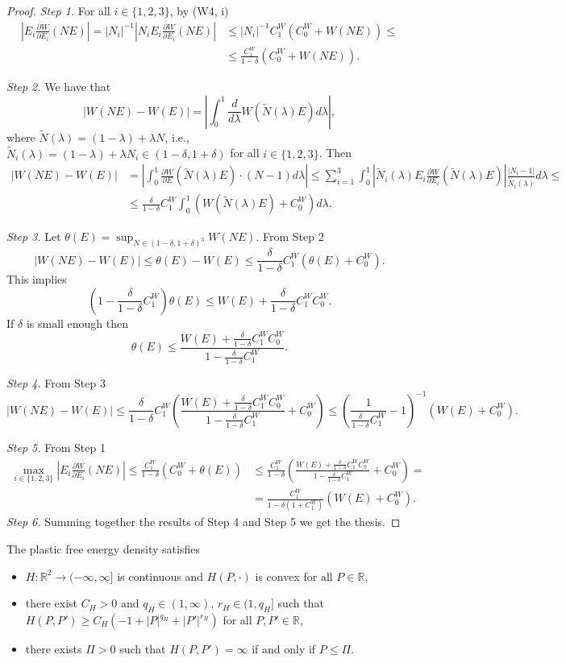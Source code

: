 \documentclass[a4paper,10pt,twoside]{amsbook}
\numberwithin{section}{chapter}
\numberwithin{equation}{chapter}
\theoremstyle{definition}
\newcommand{\dind}[2]{\frac{\partial #1}{\partial #2}}
\begin{document}
\begin{proof}
\emph{Step 1.} For all $i\in\{1,2,3\}$, by (W4, i)
\[
\begin{split}
\left|E_i\dind{W}{E_i}(NE)\right|=|N_i|^{-1}\left|N_iE_i\dind{W}{E_i}(NE)\right|&\le|N_i|^{-1}C_1^W(C_0^W+W(NE))\le\\
&\le\frac{C_1^W}{1-\delta}(C_0^W+W(NE)).
\end{split}
\]

\emph{Step 2.} We have that
\[
|W(NE)-W(E)|=\left|\int_0^1\frac{d}{d\lambda}W(\tilde N(\lambda)E)d\lambda\right|,
\]
where $\tilde N(\lambda)=(1-\lambda)+\lambda N$, i.e., $\tilde N_i(\lambda)=(1-\lambda)+\lambda N_i\in(1-\delta,1+\delta)$ for all $i\in\{1,2,3\}$. Then
\[
\begin{split}
|W(NE)-W(E)|&=\left|\int_0^1\dind{W}{E}(\tilde N(\lambda)E)\cdot(N-1)d\lambda\right|\le\sum_{i=1}^3\int_0^1\left|\tilde N_i(\lambda)E_i\dind{W}{E_i}(\tilde N(\lambda)E)\right|\frac{|N_i-1|}{\tilde N_i(\lambda)}d\lambda\le\\
&\le\frac{\delta}{1-\delta}C_1^W\int_0^1(W(\tilde N(\lambda)E)+C_0^W)d\lambda.
\end{split}
\]

\emph{Step 3.} Let $\theta(E)=\sup_{N\in(1-\delta,1+\delta)^3}W(NE)$. From Step 2
\[
|W(NE)-W(E)|\le\theta(E)-W(E)\le\frac{\delta}{1-\delta}C_1^W(\theta(E)+C_0^W).
\]
This implies
\[
\left(1-\frac{\delta}{1-\delta}C_1^W\right)\theta(E)\le W(E)+\frac{\delta}{1-\delta}C_1^WC_0^W.
\]
If $\delta$ is small enough then
\[
\theta(E)\le\frac{W(E)+\frac{\delta}{1-\delta}C_1^WC_0^W}{1-\frac{\delta}{1-\delta}C_1^W}.
\]

\emph{Step 4.} From Step 3
\[
|W(NE)-W(E)|\le\frac{\delta}{1-\delta}C_1^W\left(\frac{W(E)+\frac{\delta}{1-\delta}C_1^WC_0^W}{1-\frac{\delta}{1-\delta}C_1^W}+C_0^W\right)\le\left(\frac{1}{\frac{\delta}{1-\delta}C_1^W}-1\right)^{-1}(W(E)+C_0^W).
\]

\emph{Step 5.} From Step 1
\[
\begin{split}
\max_{i\in\{1,2,3\}}\left|E_i\dind{W}{E_i}(NE)\right|\le\frac{C_1^W}{1-\delta}(C_0^W+\theta(E))&\le\frac{C_1^W}{1-\delta}\left(\frac{W(E)+\frac{\delta}{1-\delta}C_1^WC_0^W}{1-\frac{\delta}{1-\delta}C_1^W}+C_0^W\right)=\\
&=\frac{C_1^W}{1-\delta(1+C_1^W)}(W(E)+C_0^W).
\end{split}
\]
\emph{Step 6.} Summing together the results of Step 4 and Step 5 we get the thesis.
\end{proof}
The plastic free energy density satisfies
\begin{itemize}[itemsep=1em]
\item[(H1)] $H\colon\mathbb{R}^2\to(-\infty,\infty]$ is continuous and $H(P,\cdot)$ is convex for all $P\in\mathbb{R}$,
\item[(H2)] there exist $C_H>0$ and $q_H\in(1,\infty)$, $r_H\in(1,q_H]$ such that $H(P,P')\ge C_H(-1+|P|^{q_H}+|P'|^{r_H})$ for all $P,P'\in\mathbb{R}$,
\item[(H3)] there exists $\Pi>0$ such that $H(P,P')=\infty$ if and only if $P\le\Pi$.
\end{itemize}
\end{document}
